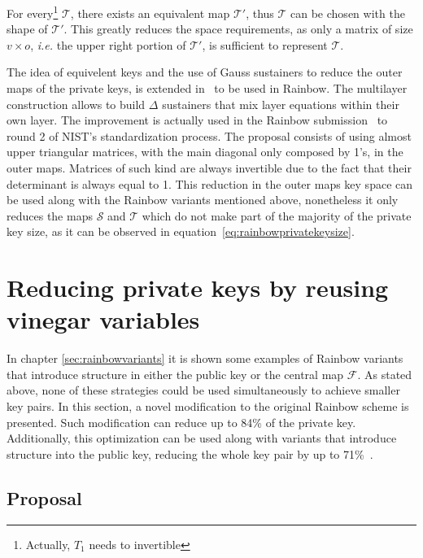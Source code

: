 \documentclass{ufsctex/ufsctex}
\begin{document}
For every\footnote{Actually, $T_1$ needs to invertible} $\mathcal{T}$, there
exists an equivalent map $\mathcal{T'}$, thus $\mathcal{T}$ can be chosen with
the shape of $\mathcal{T'}$. This greatly reduces the space requirements, as
only a matrix of size $v \times o$, \textit{i.e.} the upper right portion of
$\mathcal{T'}$, is sufficient to represent $\mathcal{T}$.

The idea of equivelent keys and the use of Gauss sustainers to reduce the outer
maps of the private keys, is extended in~\cite[Chapter 3.5]{petzoldt2013thesis}
to be used in Rainbow. The multilayer construction allows to build $\Delta$
sustainers that mix layer equations within their own layer. The improvement is
actually used in the Rainbow submission~\cite{ding2019nist} to round 2 of
NIST's standardization process.  The proposal consists of using almost upper
triangular matrices, with the main diagonal only composed by 1's, in the outer
maps. Matrices of such kind are always invertible due to the fact that their
determinant is always equal to 1.  This reduction in the outer maps key space
can be used along with the Rainbow variants mentioned above, nonetheless it
only reduces the maps $\mathcal{S}$ and $\mathcal{T}$ which do not make part of
the majority of the private key size, as it can be observed in
equation~\ref{eq:rainbowprivatekeysize}.

\chapter{Reducing private keys by reusing vinegar variables}

In chapter \ref{sec:rainbowvariants} it is shown some examples of Rainbow
variants that introduce structure in either the public key or the central map
$\mathcal{F}$. As stated above, none of these strategies could be used
simultaneously to achieve smaller key pairs. In this section, a novel
modification to the original Rainbow scheme is presented. Such modification can
reduce up to 84\% of the private key. Additionally, this optimization can be
used along with variants that introduce structure into the public key, reducing
the whole key pair by up to 71\%~\cite{zambonin2019handling}.

\section{Proposal}\label{sec:proposal}
\end{document}
